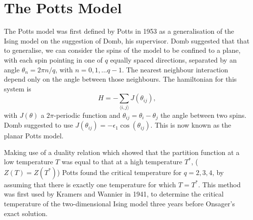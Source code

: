 \documentclass[11pt, a4paper]{report} %
\begin{document}
\section{The Potts Model}
The Potts model was first defined by Potts in 1953 as a generalisation of the Ising model on the suggestion of Domb, his supervisor.\cite{potts:1952}
Domb suggested that that to generalise, we can consider the spins of the model to be confined to a plane, with each spin pointing in one of \(q\) equally spaced directions, separated by an angle \(\theta_n = 2\pi n /q\), with \(n = 0, 1, \ldots q - 1\).
The nearest neighbour interaction depend only on the angle between those neighbours.
The hamiltonian for this system is
\begin{equation}
	H = - \sum_{\langle i, j \rangle} J(\theta_{ij}),
\end{equation}
with \(J(\theta)\) a \(2\pi\)-periodic function and \(\theta_{ij} = \theta_i - \theta_j\) the angle between two spins.
Domb suggested to use \(J(\theta_{ij}) = - \epsilon_1\cos(\theta_{ij})\).
This is now known as the planar Potts model.\cite{wu:1982}

Making use of a duality relation which showed that the partition function at a low temperature \(T\) was equal to that at a high temperature \(T^*\), (\(Z(T)=Z(T^*)\)) Potts found the critical temperature for \(q=2, 3, 4\), by assuming that there is exactly one temperature for which \(T=T^*\).
This method was first used by Kramers and Wannier in 1941\cite{kramers:1941}, to determine the critical temperature of the two-dimensional Ising model three years before Onsager's exact solution.
\end{document}
